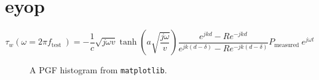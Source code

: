 \documentclass{tufte-style-article}
\begin{document}
\section{eyop}

\[
    \tau_w\left(\omega=2 \pi f_{\text {test }}\right)=-\frac{1}{c} \sqrt{j \omega v} \tanh \left(a \sqrt{\frac{j \omega}{v}}\right) \frac{e^{j k d}-R e^{-j k d}}{e^{j k(d-\delta)}-R e^{-j k(d-\delta)}} P_{\text {measured }} e^{j \omega t}
\]

\lipsum

\begin{figure}
    \begin{center}
        
    \end{center}
    \caption{A PGF histogram from \texttt{matplotlib}.}
\end{figure}
\end{document}
